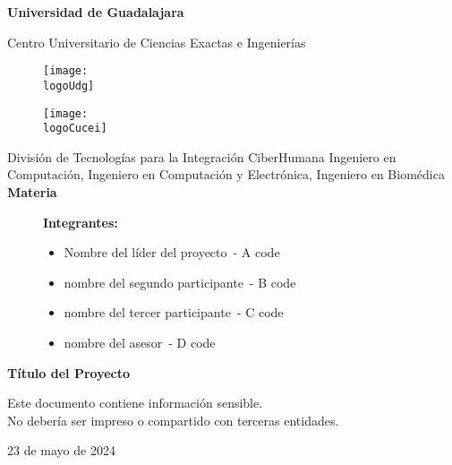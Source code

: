 \documentclass[10pt,twocolumn,letterpaper]{article}
\date{}
\title{
	\vspace*{-1cm}	\fontsize{24}{28.8}\selectfont \theTitle
}
\author{\theAuthor}
\author{\bAuthor}
\affil{\small
	\textit{CENTRO UNIVERSITARIO DE CIENCIAS}\\
	\textit{EXACTAS E INGENIERÍAS, (CUCEI, UDG)}
}
\affil{
	\fontfamily{pcr}\selectfont
	\theAuthorMail\\
	\fontfamily{pcr}\selectfont
	\bAuthorMail\\
	\fontfamily{pcr}\selectfont
	\cAuthorMail\\
	\fontfamily{pcr}\selectfont
	\dAuthorMail
	\vspace*{-8pt}
}
\newcommand{\logoUdg}{logo-udg.jpg}
\newcommand{\logoCucei}{logo-cucei.jpg}
\newcommand{\universidad}{Universidad de Guadalajara}
\newcommand{\cede}{Centro Universitario de Ciencias Exactas e Ingenierías}
\newcommand{\materia}{Materia}
\newcommand{\division}{División de Tecnologías para la Integración CiberHumana}
\newcommand{\theTitle}{Título del Proyecto}
\newcommand{\startDate}{23 de mayo de 2024}
\newcommand{\theAuthor}{Nombre del líder del proyecto}
\newcommand{\bAuthor}{nombre del segundo participante}
\newcommand{\cAuthor}{nombre del tercer participante}
\newcommand{\dAuthor}{nombre del asesor}
\newcommand{\theAuthorCode}{A code}
\newcommand{\bAuthorCode}{B code}
\newcommand{\cAuthorCode}{C code}
\newcommand{\dAuthorCode}{D code}
\newcommand{\aTitutlo}{Ingeniero en Computación}
\newcommand{\btitulo}{Ingeniero en Computación y Electrónica}
\newcommand{\cTitulo}{Ingeniero en Biomédica}
\begin{document}
\begin{titlepage}
	\centering
	{\huge\textbf{\universidad}}\par\vspace{0.6cm}
	{\LARGE{\cede}}\vfill
	
	\begin{figure}[h]
		\begin{minipage}[t]{0.45\textwidth}
			\centering
			\texttt{[image: \\logoUdg]}
		\end{minipage}
		\hfill
		\begin{minipage}[t]{0.45\textwidth}
			\centering
			\texttt{[image: \\logoCucei]}
		\end{minipage}
	\end{figure}\vfill
	
	\Large{
		\division\vfill
		\aTitutlo, \btitulo, \cTitulo\vfill
		\textbf{\materia}\vfill
	}

	\begin{figure}[h]
		\centering
		\begin{minipage}[t]{0.75\textwidth}
			{\Large
				\textbf{Integrantes:}
				\begin{itemize}
					\item \theAuthor\ - \theAuthorCode
					\item \bAuthor\ - \bAuthorCode
					\item \cAuthor\ - \cAuthorCode
					\item \dAuthor\ - \dAuthorCode
				\end{itemize}
			}
		\end{minipage}
	\end{figure}\vfill

	{\LARGE{\textbf{\theTitle}}}\vfill
	
	\begin{tcolorbox}[colback=red!5!white, colframe=red!75!black]
		\centering
		Este documento contiene información sensible.\\
		No debería ser impreso o compartido con terceras entidades.
	\end{tcolorbox}\vfill

	{\large \startDate}\par
\end{titlepage}

\maketitle
\end{document}
